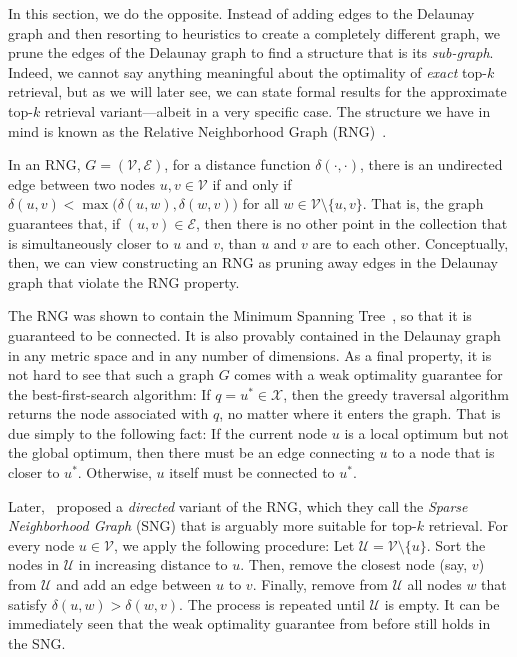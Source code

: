 In this section, we do the opposite. Instead of adding edges to the Delaunay graph and
then resorting to heuristics to create a completely different graph,
we prune the edges of the Delaunay graph to find a structure that is its \emph{sub-graph}.
Indeed, we cannot say anything meaningful about the optimality of
\emph{exact} top-$k$ retrieval, but as we will later see, we can state formal results
for the approximate top-$k$ retrieval variant---albeit in a very specific case.
The structure we have in mind is known as the Relative Neighborhood
Graph (RNG)~\citep{Toussaint1980rng,relativeNeighborhoodGraphs}.

\begin{svgraybox}
In an RNG, $G = (\mathcal{V}, \mathcal{E})$, for a distance function $\delta(\cdot, \cdot)$,
there is an undirected edge between two nodes $u, v \in \mathcal{V}$ if and only if
$\delta(u, v) < \max \big( \delta(u, w), \delta(w, v) \big)$ for all
$w \in \mathcal{V} \setminus \{ u, v\}$.
That is, the graph guarantees that, if $(u, v) \in \mathcal{E}$, then there is no other
point in the collection that is simultaneously closer to $u$ and $v$, than $u$ and $v$ are to
each other. Conceptually, then, we can view constructing an RNG as pruning away
edges in the Delaunay graph that violate the RNG property.
\end{svgraybox}

The RNG was shown to contain the Minimum Spanning Tree~\citep{Toussaint1980rng},
so that it is guaranteed to be connected.
It is also provably contained in the Delaunay graph~\citep{OROURKE1982} in any metric
space and in any number of dimensions.
As a final property, it is not hard to see that such a graph $G$ comes with a weak
optimality guarantee for the best-first-search algorithm:
If $q = u^\ast \in \mathcal{X}$, then the greedy traversal algorithm
returns the node associated with $q$, no matter where it enters the graph.
That is due simply to the following fact: If the current node $u$ is a local optimum
but not the global optimum, then there must be an edge connecting $u$ to a node
that is closer to $u^\ast$. Otherwise, $u$ itself must be connected to $u^\ast$.

Later,~\cite{arya1993sng} proposed a \emph{directed} variant of the RNG,
which they call the \emph{Sparse Neighborhood Graph} (SNG) that is arguably
more suitable for top-$k$ retrieval.
For every node $u \in \mathcal{V}$, we apply the following procedure:
Let $\mathcal{U} = \mathcal{V} \setminus \{ u \}$.
Sort the nodes in $\mathcal{U}$ in increasing distance to $u$.
Then, remove the closest node (say, $v$) from $\mathcal{U}$ and add an edge between $u$ to $v$.
Finally, remove from $\mathcal{U}$ all nodes $w$ that satisfy $\delta(u, w) > \delta(w, v)$.
The process is repeated until $\mathcal{U}$ is empty.
It can be immediately seen that the weak optimality guarantee from before still holds in the SNG.

